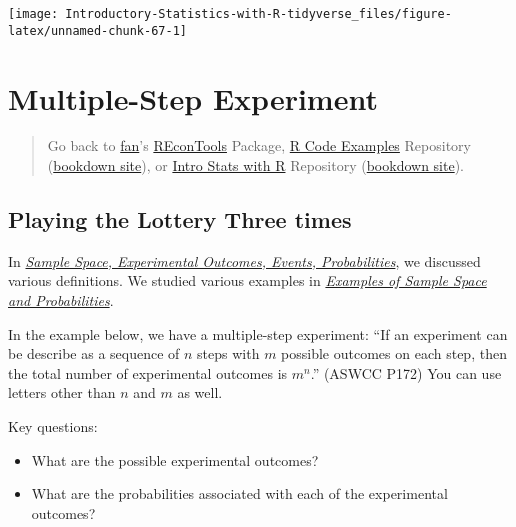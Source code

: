 \documentclass[
]{book}
\providecommand{\tightlist}{%
  \setlength{\itemsep}{0pt}\setlength{\parskip}{0pt}}
\begin{document}
\begin{center}\texttt{[image: Introductory-Statistics-with-R-tidyverse\_files/figure-latex/unnamed-chunk-67-1]} \end{center}

\hypertarget{multiple-step-experiment}{%
\section{Multiple-Step Experiment}\label{multiple-step-experiment}}

\begin{quote}
Go back to \href{http://fanwangecon.github.io/}{fan}'s \href{https://fanwangecon.github.io/REconTools/}{REconTools} Package, \href{https://fanwangecon.github.io/R4Econ/}{R Code Examples} Repository (\href{https://fanwangecon.github.io/R4Econ/bookdown}{bookdown site}), or \href{https://fanwangecon.github.io/Stat4Econ/}{Intro Stats with R} Repository (\href{https://fanwangecon.github.io/Stat4Econ/bookdown}{bookdown site}).
\end{quote}

\hypertarget{playing-the-lottery-three-times}{%
\subsection{Playing the Lottery Three times}\label{playing-the-lottery-three-times}}

In \emph{\href{https://fanwangecon.github.io/Stat4Econ/probability/htmlpdfr/samplespace.html}{Sample Space, Experimental Outcomes, Events, Probabilities}}, we discussed various definitions. We studied various examples in \href{https://fanwangecon.github.io/Stat4Econ/probability/htmlpdfr/samplespaceexa.html}{\emph{Examples of Sample Space and Probabilities}}.

In the example below, we have a multiple-step experiment: ``If an experiment can be describe as a sequence of \(n\) steps with \(m\) possible outcomes on each step, then the total number of experimental outcomes is \(m^n\).'' (ASWCC P172) You can use letters other than \(n\) and \(m\) as well.

Key questions:

\begin{itemize}
\tightlist
\item
  What are the possible experimental outcomes?
\item
  What are the probabilities associated with each of the experimental outcomes?
\end{itemize}
\end{document}
